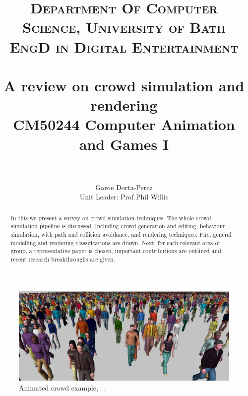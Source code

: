 \documentclass[6pt]{article} %
\title{	
\normalfont \normalsize 
\textsc{Department Of Computer Science, University of Bath} \\ [5pt] %
\textsc{EngD in Digital Entertainment} \\ [5pt] 
\horrule{0.7pt} \\[0.2cm] %
\Huge A review on crowd simulation and rendering \\ %
\vspace{7 mm}
\Large CM50244 \: Computer Animation and Games I \\
\horrule{0.7pt} \\[0.0cm] %
}
\author{Garoe Dorta-Perez \\ \Large Unit Leader: Prof Phil Willis \\}  %
\begin{document}
\vspace*{\fill}
\begin{center}
	\begin{minipage}{1.0\textwidth}
		\maketitle %
		\thispagestyle{empty}
	\end{minipage}
\end{center}



\vfill %
\begin{abstract}
\normalsize %
In this we present a survey on crowd simulation techniques.
The whole crowd simulation pipeline is discussed.
Including crowd generation and editing, behaviour simulation, with path and collision avoidance, and rendering techniques.
Firs, general modelling and rendering classifications are drawn.
Next, for each relevant area or group, a representative paper is chosen, important contributions are outlined and recent research breakthroughs are given.
\end{abstract}
\vfill %

\clearpage %



\begin{figure}
		\centering
		\includegraphics[scale=0.3]{images/crowd2}
		\caption{Animated crowd example, ~\cite{ruiz2013}.}
\end{figure}
\end{document}
